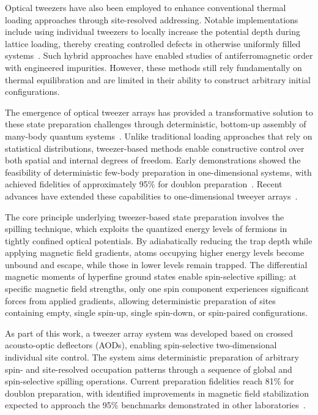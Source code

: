 Optical tweezers have also been employed to enhance conventional thermal loading approaches through site-resolved addressing. Notable implementations include using individual tweezers to locally increase the potential depth during lattice loading, thereby creating controlled defects in otherwise uniformly filled systems~\cite{koepsell_imaging_2019}. Such hybrid approaches have enabled studies of antiferromagnetic order with engineered impurities.
However, these methods still rely fundamentally on thermal equilibration and are limited in their ability to construct arbitrary initial configurations.

The emergence of optical tweezer arrays has provided a transformative solution to these state preparation challenges through deterministic, bottom-up assembly of many-body quantum systems~\cite{serwane_deterministic_2011}. Unlike traditional loading approaches that rely on statistical distributions, tweezer-based methods enable constructive control over both spatial and internal degrees of freedom. Early demonstrations showed the feasibility of deterministic few-body preparation in one-dimensional systems, with achieved fidelities of approximately 95\% for doublon preparation~\cite{holten_pauli_2022,spar_realization_2022}. Recent advances have extended these capabilities to one-dimensional tweeyer arrays~\cite{stuart_single-atom_2018,gyger_continuous_2024,spar_realization_2022}.

The core principle underlying tweezer-based state preparation involves the spilling technique, which exploits the quantized energy levels of fermions in tightly confined optical potentials. By adiabatically reducing the trap depth while applying magnetic field gradients, atoms occupying higher energy levels become unbound and escape, while those in lower levels remain trapped. The differential magnetic moments of hyperfine ground states enable spin-selective spilling: at specific magnetic field strengths, only one spin component experiences significant forces from applied gradients, allowing deterministic preparation of sites containing empty, single spin-up, single spin-down, or spin-paired configurations.

As part of this work, a tweezer array system was developed based on crossed acousto-optic deflectors (AODs), enabling spin-selective two-dimensional individual site control. The system aims deterministic preparation of arbitrary spin- and site-resolved occupation patterns through a sequence of global and spin-selective spilling operations. Current preparation fidelities reach 81\% for doublon preparation, with identified improvements in magnetic field stabilization expected to approach the 95\% benchmarks demonstrated in other laboratories~\cite{holten_pauli_2022,serwane_deterministic_2011,spar_realization_2022}.

